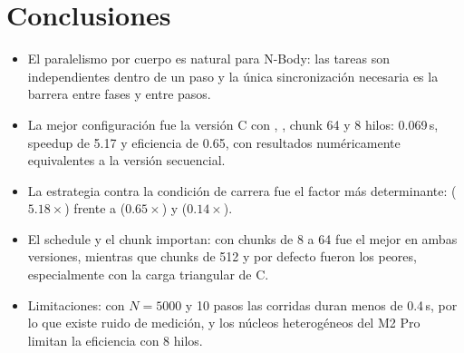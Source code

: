 \section{Conclusiones}

\begin{itemize}
\item El paralelismo por cuerpo es natural para N-Body: las tareas son independientes dentro de un
paso y la única sincronización necesaria es la barrera entre fases y entre pasos.
\item La mejor configuración fue la versión C con , , chunk 64 y 8
hilos: 0.069\,s, speedup de 5.17 y eficiencia de 0.65, con resultados numéricamente equivalentes a la
versión secuencial.
\item La estrategia contra la condición de carrera fue el factor más determinante:
 ($5.18\times$) frente a  ($0.65\times$) y 
($0.14\times$).
\item El schedule y el chunk importan:  con chunks de 8 a 64 fue el mejor en ambas
versiones, mientras que chunks de 512 y  por defecto fueron los peores, especialmente con
la carga triangular de C.
\item Limitaciones: con $N = 5000$ y 10 pasos las corridas duran menos de 0.4\,s, por lo que existe
ruido de medición, y los núcleos heterogéneos del M2 Pro limitan la eficiencia con 8 hilos.
\end{itemize}
